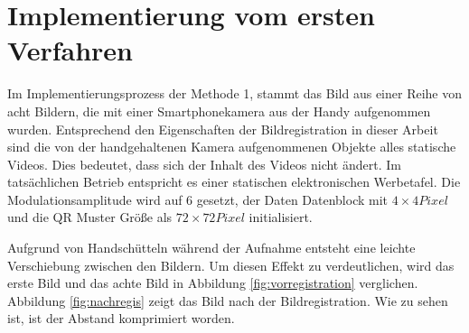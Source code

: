 \section{Implementierung vom ersten Verfahren}
Im Implementierungsprozess der Methode 1, stammt das Bild aus einer Reihe von acht Bildern, die mit einer Smartphonekamera aus der Handy aufgenommen wurden. Entsprechend den Eigenschaften der Bildregistration in dieser Arbeit sind die von der handgehaltenen Kamera aufgenommenen Objekte alles statische Videos. Dies bedeutet, dass sich der Inhalt des Videos nicht ändert. Im tatsächlichen Betrieb entspricht es einer statischen elektronischen Werbetafel. Die Modulationsamplitude wird auf 6 gesetzt, der Daten Datenblock mit $ 4 \times 4 Pixel$ und die QR Muster Größe als $ 72 \times 72 Pixel$ initialisiert.

Aufgrund von Handschütteln während der Aufnahme entsteht eine leichte Verschiebung zwischen den Bildern. Um diesen Effekt zu verdeutlichen, wird das erste Bild und das achte Bild in Abbildung \ref{fig:vorregistration} verglichen. 
Abbildung \ref{fig:nachregis} zeigt das Bild nach der Bildregistration. Wie zu sehen ist, ist der Abstand komprimiert worden. %
 
